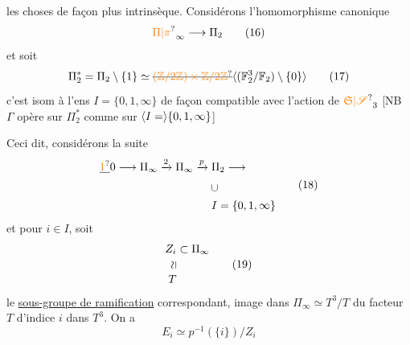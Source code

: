les choses de façon plus intrinsèque. Considérons
l'homomorphisme canonique
\[
\unsure{\Pi|\pi}_\infty\longrightarrow\Pi_2\tag*{(16)}
\]
et soit
\[
\Pi_2^*=\Pi_2\setminus\{1\}\simeq\deleted{\unsure{(\mathbb Z/2\mathbb Z)\times\mathbb Z/2\mathbb Z}}
\inserted{(\mathbb F_2^3/\mathbb F_2)\setminus\{0\}}\tag*{(17)}
\]
c'est isom à l'ens $I=\{0,1,\infty\}$ de façon compatible
avec l'action de $\unsure{\mathfrak S|\mathscr S}_3$ [NB $\Gamma$ opère 
sur $\Pi_2^*$ comme sur $\inserted{I=}\{0,1,\infty\}$]

Ceci dit, 
considérons la suite  
\[
\begin{aligned}
\deleted{\unsure{1}}0\longrightarrow\Pi_\infty\xrightarrow{2}\Pi_\infty
\xrightarrow{p}{}&\Pi_2\longrightarrow{}\\
&\rotatebox{90}{$\subset$}\\
&I=\{0,1,\infty\}
\end{aligned}\tag*{(18)}
\]
et pour $i\in I$, soit 
\[
\begin{aligned}
Z_i&\subset\Pi_\infty\\
\rotatebox{90}{$\simeq$}&\\[-3pt]
T&
\end{aligned}\tag*{(19)}
\]
le \uline{sous-groupe de ramification} correspondant,
image dans $\Pi_\infty\simeq T^3/T$ du  facteur $T$
d'indice $i$ dans $T^3$.  On a 
\[
E_i\simeq p^{-1}(\{i\})/Z_i\tag*{(20)}
\]

